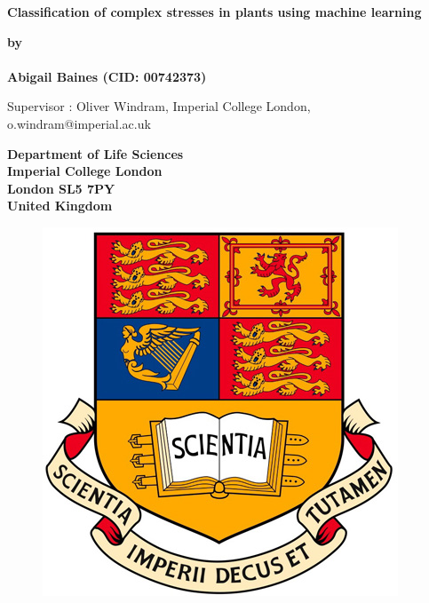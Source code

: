 \thispagestyle{empty}
\null\vskip0.2in%
\begin{center}
\LARGE{{\bf 
Classification of complex stresses in plants using machine learning}}
\end{center}

\vspace{0.5cm}

\begin{center}
{\Large {\bf by}}\\
\mbox{} \\
{\Large {\bf Abigail Baines (CID: 00742373)}}

{\Large Supervisor : Oliver Windram, Imperial College London, o.windram@imperial.ac.uk}
\end{center}

\vspace{1cm}

\begin{center}
\large{\bf{Department of Life Sciences \\ Imperial College London \\
London SL5 7PY \\ United Kingdom}}
\end{center}


\vspace{1cm}

\begin{figure}[!h]
\centering
\includegraphics[scale=0.35]{imperial_crest_colour.jpg}
\end{figure}

